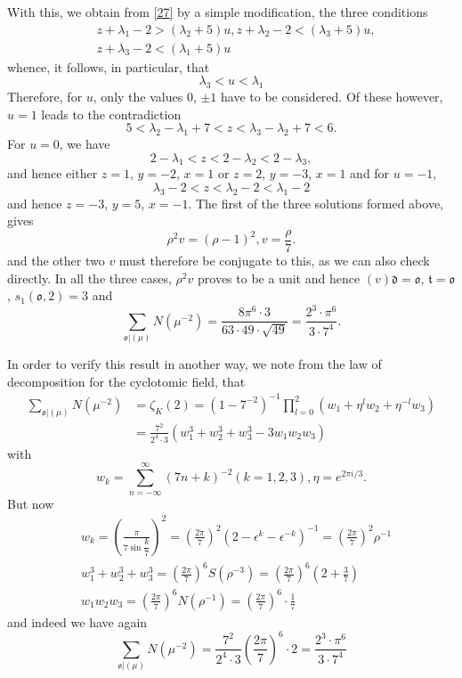 With this, we obtain from \eqref{27} by a simple modification, the
three conditions
\begin{align*}
& z+\lambda_{1}-2>(\lambda_{2}+5)u, z+\lambda_{2}-2<(\lambda_{3}+5)u,\\
& z+\lambda_{3}-2<(\lambda_{1}+5)u
\end{align*}
whence, it follows, in particular, that
$$
\lambda_{3}<u<\lambda_{1}
$$
Therefore, for $u$, only the values $0$, $\pm 1$ have to be
considered. Of these however, $u=1$ leads to the contradiction
$$
5<\lambda_{2}-\lambda_{1}+7<z<\lambda_{3}-\lambda_{2}+7<6.
$$
For $u=0$, we have
$$
2-\lambda_{1}<z<2-\lambda_{2}<2-\lambda_{3},
$$
and hence either $z=1$, $y=-2$, $x=1$ or $z=2$, $y=-3$, $x=1$ and for
$u=-1$,
$$
\lambda_{3}-2<z<\lambda_{2}-2<\lambda_{1}-2
$$
and hence $z=-3$, $y=5$, $x=-1$. The first of the three solutions
formed above, gives
$$
\rho^{2}v=(\rho-1)^{2},v=\frac{\rho}{7}.
$$
and the other two $v$ must therefore be conjugate to this, as we can
also check directly. In all the three cases, $\rho^{2}v$ proves to be
a unit and hence $(v)\mathfrak{d}=\mathfrak{o}$,
$\mathfrak{t}=\mathfrak{o}$, $s_{1}(\mathfrak{o},2)=3$ and
$$
\sum_{\mathfrak{o}|(\mu)}N(\mu^{-2})=\frac{8\pi^{6}\cdot 3}{63\cdot
  49\cdot \sqrt{49}}=\frac{2^{3}\cdot \pi^{6}}{3\cdot 7^{4}}.
$$

In order to verify this result in another way, we note from the law of
decomposition for the cyclotomic field, that
\begin{align*}
\sum_{\mathfrak{o}|(\mu)}N(\mu^{-2}) &=
\zeta_{K}(2)=(1-7^{-2})^{-1}\prod^{2}_{l=0}(w_{1}+\eta^{l}w_{2}+\eta^{-l}w_{3})\\
&= \frac{7^{2}}{2^{4}\cdot
  3}(w^{3}_{1}+w^{3}_{2}+w^{3}_{3}-3w_{1}w_{2}w_{3})
\end{align*}\pageoriginale
with
$$
w_{k}=\sum^{\infty}_{n=-\infty}(7n+k)^{-2}(k=1,2,3),\eta=e^{2\pi i/3}.
$$
But now
\begin{align*}
& w_{k}=\left(\frac{\pi}{7\sin
  \dfrac{k}{7}}\right)^{2}=\left(\frac{2\pi}{7}\right)^{2}(2-\epsilon^{k}-\epsilon^{-k})^{-1}=\left(\frac{2\pi}{7}\right)^{2}\rho^{-1}\\
&
  w^{3}_{1}+w^{3}_{2}+w^{3}_{3}=\left(\frac{2\pi}{7}\right)^{6}S(\rho^{-3})=\left(\frac{2\pi}{7}\right)^{6}\left(2+\frac{3}{7}\right)\\
&
  w_{1}w_{2}w_{3}=\left(\frac{2\pi}{7}\right)^{6}N(\rho^{-1})=\left(\frac{2\pi}{7}\right)^{6}\cdot\frac{1}{7}  
\end{align*}
and indeed we have again
$$
\sum_{\mathfrak{o}|(\mu)}N(\mu^{-2})=\frac{7^{2}}{2^{4}\cdot
  3}\left(\frac{2\pi}{7}\right)^{6}\cdot
2=\frac{2^{3}\cdot\pi^{6}}{3\cdot 7^{4}}
$$

